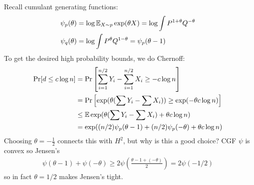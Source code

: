 Recall cumulant generating functions:
\begin{align}
  \psi_p(\theta) 
  &= \log \mathbb{E}_{X \sim p} \exp(\theta X)
  = \log \int P^{1+\theta}Q^{-\theta} \\
  \psi_q(\theta)
  &= \log \int P^\theta Q^{1-\theta} = \psi_p(\theta-1)
\end{align}
To get the desired high probability bounds, we do Chernoff:
\begin{align}
  \Pr[d \leq c \log n]
  &= \Pr\left[
    \sum_{i=1}^{n/2} Y_i - \sum_{i=1}^{n/2} X_i \geq -c \log n
  \right] \\
  &= \Pr\left[
    \exp(\theta(\sum Y_i - \sum X_i)) \geq \exp(-\theta c \log n)
  \right] \\
  &\leq \mathbb{E} \exp( \theta (\sum Y_i - \sum X_i) + \theta c \log n) \\
  &= \exp( (n/2) \psi_p(\theta - 1) + (n/2) \psi_p(-\theta) + \theta c \log n)
\end{align}
Choosing $\theta = -\frac{1}{2}$ connects this with $H^2$, but why is this
a good choice? CGF $\psi$ is convex so Jensen's
\begin{align}
  \psi(\theta - 1) + \psi(-\theta)
  \geq 2 \psi \left( \frac{\theta - 1 + (-\theta)}{2}\right)
  = 2 \psi(-1/2)
\end{align}
so in fact $\theta = 1/2$ makes Jensen's tight.
